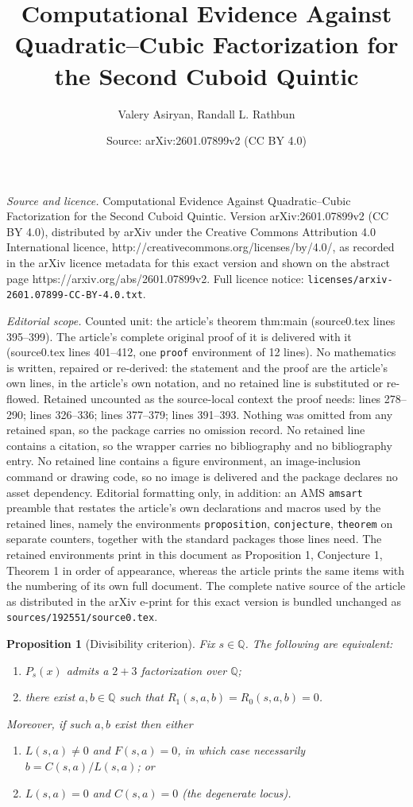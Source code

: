 \documentclass[10pt,a4paper]{amsart}
\title{Computational Evidence Against Quadratic--Cubic Factorization for the Second Cuboid Quintic}
\author{Valery Asiryan, Randall L. Rathbun}
\date{Source: arXiv:2601.07899v2 (CC BY 4.0)}
\newtheorem{proposition}{Proposition}
\begin{document}
\maketitle

\noindent\emph{Source and licence.} Computational Evidence Against Quadratic--Cubic Factorization for the Second Cuboid Quintic. Version arXiv:2601.07899v2 (CC BY 4.0), distributed by arXiv under the Creative Commons Attribution 4.0 International licence, http://creativecommons.org/licenses/by/4.0/, as recorded in the arXiv licence metadata for this exact version and shown on the abstract page https://arxiv.org/abs/2601.07899v2. Full licence notice: \texttt{licenses/arxiv-2601.07899-CC-BY-4.0.txt}.\par\smallskip

\noindent\textit{Editorial scope.} Counted unit: the article's theorem thm:main (source0.tex lines 395--399). The article's complete original proof of it is delivered with it (source0.tex lines 401--412, one \texttt{proof} environment of 12 lines). No mathematics is written, repaired or re-derived: the statement and the proof are the article's own lines, in the article's own notation, and no retained line is substituted or re-flowed.  Retained uncounted as the source-local context the proof needs: lines 278--290; lines 326--336; lines 377--379; lines 391--393.  Nothing was omitted from any retained span, so the package carries no omission record.  No retained line contains a citation, so the wrapper carries no bibliography and no bibliography entry.  No retained line contains a figure environment, an image-inclusion command or drawing code, so no image is delivered and the package declares no asset dependency.  Editorial formatting only, in addition: an AMS \texttt{amsart} preamble that restates the article's own declarations and macros used by the retained lines, namely the environments \texttt{proposition}, \texttt{conjecture}, \texttt{theorem} on separate counters, together with the standard packages those lines need.  The retained environments print in this document as Proposition 1, Conjecture 1, Theorem 1 in order of appearance, whereas the article prints the same items with the numbering of its own full document.  The complete native source of the article as distributed in the arXiv e-print for this exact version is bundled unchanged as \texttt{sources/192551/source0.tex}.
\begin{proposition}[Divisibility criterion]\label{prop:criterion}
Fix $s\in\mathbb{Q}$.
The following are equivalent:
\begin{enumerate}
\item $P_s(x)$ admits a $2+3$ factorization over $\mathbb{Q}$;
\item there exist $a,b\in\mathbb{Q}$ such that $R_1(s,a,b)=R_0(s,a,b)=0$.
\end{enumerate}
Moreover, if such $a,b$ exist then either
\begin{enumerate}
\item[(A)] $L(s,a)\neq 0$ and $F(s,a)=0$, in which case necessarily $b=C(s,a)/L(s,a)$; or
\item[(B)] $L(s,a)=0$ and $C(s,a)=0$ (the \emph{degenerate locus}).
\end{enumerate}
\end{proposition}
\end{document}
